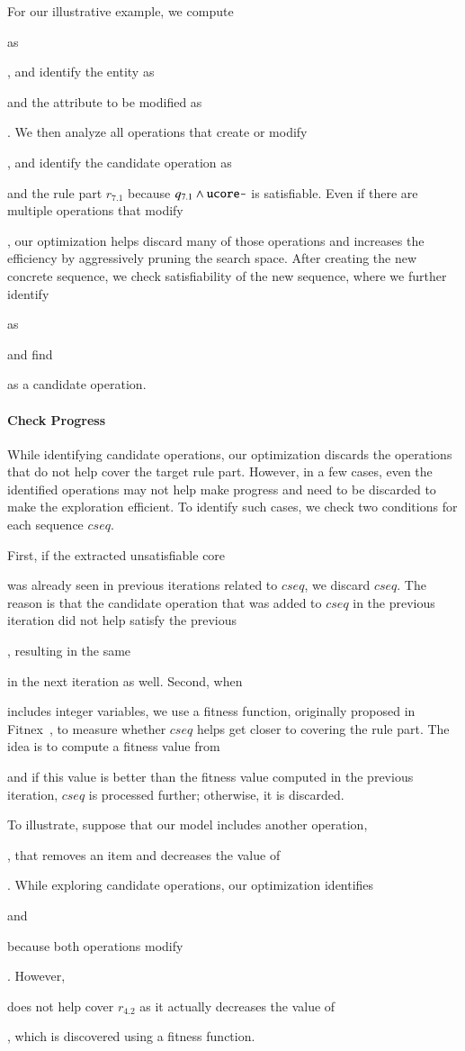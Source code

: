 For our illustrative example, we compute \subject{ucore-} as \subject{ord.total
  > 0}, and identify the entity as \subject{Order} and the attribute to be
modified as \subject{total}. We then analyze all operations that create or
modify \subject{Order}, and identify the candidate operation as
\subject{AddItemToOrder} and the rule part $r_{7.1}$ because $q_{7.1} \wedge
\subject{ucore-}$ is satisfiable. Even if there are multiple operations that
modify \subject{Order}, our optimization helps discard many of those operations
and increases the efficiency by aggressively pruning the search space.  After
creating the new concrete sequence, we check satisfiability of the new sequence,
where we further identify \subject{ucore} as \subject{cust.crLimit = 0 $\wedge$
  cust.crLimit > 0} and find \subject{AddCreditLimit} as a candidate operation.

\paragraph*{Check Progress} While identifying candidate operations, our
optimization discards the operations that do not help cover the target rule
part. However, in a few cases, even the identified operations may not help make
progress and need to be discarded to make the exploration efficient. To identify
such cases, we check two conditions for each sequence $cseq$.

First, if the extracted unsatisfiable core \subject{ucore} was already seen in
previous iterations related to $cseq$, we discard $cseq$. The reason is that the
candidate operation that was added to $cseq$ in the previous iteration did not
help satisfy the previous \subject{ucore}, resulting in the same \subject{ucore}
in the next iteration as well.  Second, when \subject{ucore} includes integer
variables, we use a fitness function, originally proposed in
Fitnex~\cite{xie09:fitness}, to measure whether $cseq$ helps get closer to
covering the rule part.
The idea is to compute a fitness value from \subject{ucore} and if this value is
better than the fitness value computed in the previous iteration, $cseq$ is
processed further; otherwise, it is discarded.

To illustrate, suppose that our model includes another operation,
\subject{RemoveItemFromOrder}, that removes an item and decreases the value of
\subject{Order.total}. While exploring candidate operations, our optimization
identifies \subject{AddItemToOrder} and \subject{RemoveItemFromOrder} because
both operations modify \subject{total}. However, \subject{RemoveItemFromOrder}
does not help cover $r_{4.2}$ as it actually decreases the value of
\subject{total}, which is discovered using a fitness function.

